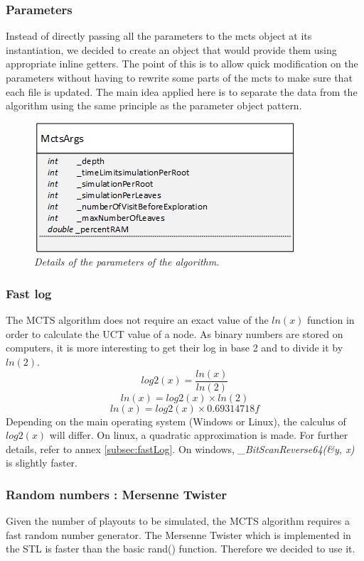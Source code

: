 \subsubsection{Parameters}
Instead of directly passing all the parameters to the mcts object at its instantiation, we decided to create an object that would provide them using appropriate inline getters. The point of this is to allow quick modification on the parameters without having to rewrite some parts of the mcts to make sure that each file is updated. The main idea applied here is to separate the data from the algorithm using the same principle as the parameter object pattern.
\begin{figure}[H] 
\centerline{\includegraphics[scale=0.8]{Data_Structure/Img/MctsArgs.png}}
\caption{\label{fig:mctsargsuml}\textit{Details of the parameters of the algorithm}.}
\end{figure}

\subsubsection{Fast log}
The MCTS algorithm does not require an exact value of the \ensuremath{ln(x)} function in order to calculate the UCT value of a node. As binary numbers are stored on computers, it is more interesting to get their log in base 2 and to divide it by \ensuremath{ln(2)}. 
\begin{equation}
log2(x) = \frac{ln(x)}{ln(2)}
\end{equation}
\begin{equation}
ln(x) = log2(x) \times ln(2)
\end{equation}
\begin{equation}
ln(x) = log2(x) \times 0.69314718f
\end{equation}
Depending on the main operating system (Windows or Linux), the calculus of \ensuremath{log2(x)} will differ. On linux, a quadratic approximation is made. For further details, refer to annex \ref{subsec:fastLog}. On windows, \textit{\_BitScanReverse64(\&y, x)} is slightly faster. 

\subsubsection{Random numbers : Mersenne Twister}
Given the number of playouts to be simulated, the MCTS algorithm requires a fast random number generator. The Mersenne Twister which is implemented in the STL is faster than the basic rand() function. Therefore we decided to use it.


